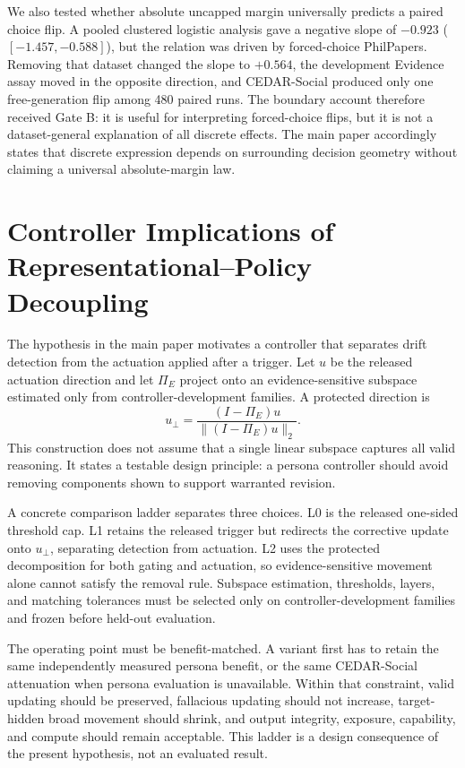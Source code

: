 \documentclass[letterpaper]{article}
\begin{document}
We also tested whether absolute uncapped margin universally predicts a paired choice flip.  A pooled clustered logistic analysis gave a negative slope of $-0.923$ ($[-1.457,-0.588]$), but the relation was driven by forced-choice PhilPapers.  Removing that dataset changed the slope to $+0.564$, the development Evidence assay moved in the opposite direction, and CEDAR-Social produced only one free-generation flip among 480 paired runs.  The boundary account therefore received Gate B: it is useful for interpreting forced-choice flips, but it is not a dataset-general explanation of all discrete effects.  The main paper accordingly states that discrete expression depends on surrounding decision geometry without claiming a universal absolute-margin law.

\section{Controller Implications of Representational--Policy Decoupling}
\label{supp:controller}

The hypothesis in the main paper motivates a controller that separates drift detection from the actuation applied after a trigger.  Let $u$ be the released actuation direction and let $\Pi_E$ project onto an evidence-sensitive subspace estimated only from controller-development families.  A protected direction is
\begin{equation}
u_{\perp}=\frac{(I-\Pi_E)u}{\lVert(I-\Pi_E)u\rVert_2}.
\end{equation}
This construction does not assume that a single linear subspace captures all valid reasoning.  It states a testable design principle: a persona controller should avoid removing components shown to support warranted revision.

A concrete comparison ladder separates three choices.  L0 is the released one-sided threshold cap.  L1 retains the released trigger but redirects the corrective update onto $u_{\perp}$, separating detection from actuation.  L2 uses the protected decomposition for both gating and actuation, so evidence-sensitive movement alone cannot satisfy the removal rule.  Subspace estimation, thresholds, layers, and matching tolerances must be selected only on controller-development families and frozen before held-out evaluation.

The operating point must be benefit-matched.  A variant first has to retain the same independently measured persona benefit, or the same CEDAR-Social attenuation when persona evaluation is unavailable.  Within that constraint, valid updating should be preserved, fallacious updating should not increase, target-hidden broad movement should shrink, and output integrity, exposure, capability, and compute should remain acceptable.  This ladder is a design consequence of the present hypothesis, not an evaluated result.
\end{document}
